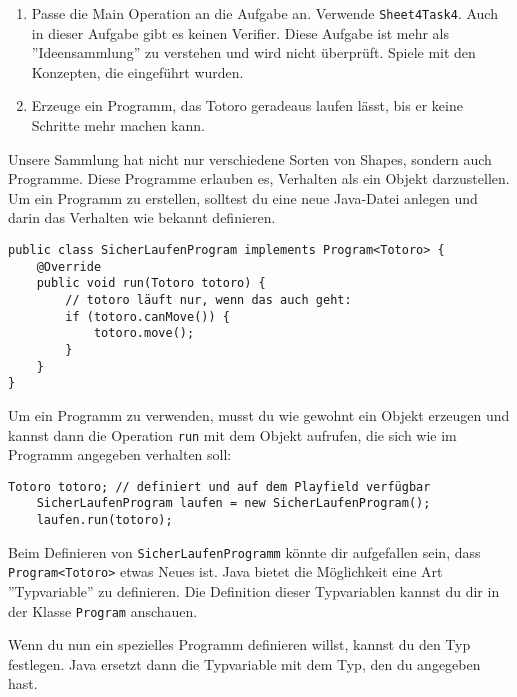 
\begin{enumerate}
	\item Passe die Main Operation an die Aufgabe an.
		Verwende \lstinline{Sheet4Task4}. Auch in dieser Aufgabe gibt es keinen Verifier.
		Diese Aufgabe ist mehr als ''Ideensammlung'' zu verstehen und wird nicht überprüft.
		Spiele mit den Konzepten, die eingeführt wurden.
	\item Erzeuge ein Programm, das Totoro geradeaus laufen lässt, bis er keine Schritte mehr machen kann.
\end{enumerate}

\begin{Infobox}[Programme]
	Unsere Sammlung hat nicht nur verschiedene Sorten von Shapes, sondern auch Programme.
	Diese Programme erlauben es, Verhalten als ein Objekt darzustellen.
	Um ein Programm zu erstellen, solltest du eine neue Java-Datei anlegen und darin das Verhalten wie bekannt definieren.

	\begin{lstlisting}[title=SicherLaufenProgram.java, numbers=none,xleftmargin=0.5cm]
public class SicherLaufenProgram implements Program<Totoro> {
	@Override
	public void run(Totoro totoro) {
		// totoro läuft nur, wenn das auch geht:
		if (totoro.canMove()) {
			totoro.move();
		}
	}
}
	\end{lstlisting}

	Um ein Programm zu verwenden, musst du wie gewohnt ein Objekt erzeugen und kannst dann die Operation \lstinline{run} mit dem Objekt aufrufen, die sich wie im Programm angegeben verhalten soll:

	\begin{lstlisting}[numbers=none,xleftmargin=0.5cm]
	Totoro totoro; // definiert und auf dem Playfield verfügbar
	SicherLaufenProgram laufen = new SicherLaufenProgram();
	laufen.run(totoro);
	\end{lstlisting}
\end{Infobox}

\begin{Infobox}
	Beim Definieren von \lstinline{SicherLaufenProgramm} könnte dir aufgefallen sein, dass \mbox{\lstinline{Program<Totoro>}} etwas Neues ist.
	Java bietet die Möglichkeit eine Art ''Typvariable'' zu definieren.
	Die Definition dieser Typvariablen kannst du dir in der Klasse \lstinline{Program} anschauen.

	Wenn du nun ein spezielles Programm definieren willst, kannst du den Typ festlegen.
	Java ersetzt dann die Typvariable mit dem Typ, den du angegeben hast.
\end{Infobox}

